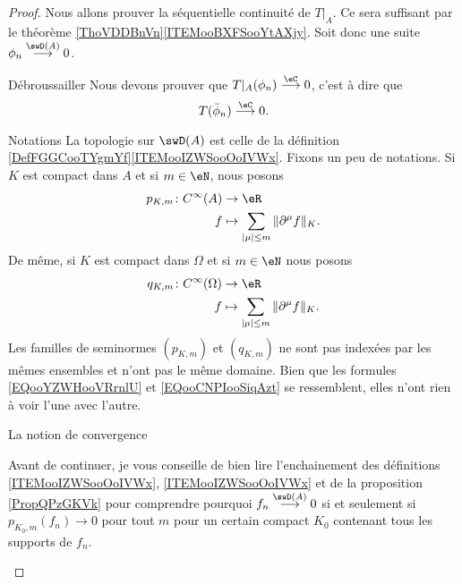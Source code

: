 \begin{proof}
    Nous allons prouver la séquentielle continuité de \( T|_A\). Ce sera suffisant par le théorème \ref{ThoVDDBnVn}\ref{ITEMooBXFSooYtAXjy}. Soit donc une suite \( \phi_n\stackrel{\swD(A)}{\longrightarrow}0\). 

    \begin{subproof}
    \item[Débroussailler]
    Nous devons prouver que \( T|_A(\phi_n)\stackrel{\eC}{\longrightarrow}0\), c'est à dire que
    \begin{equation}
        T(\bar \phi_n)\stackrel{\eC}{\longrightarrow}0.
    \end{equation}
\item[Notations]
    La topologie sur \( \swD(A)\) est celle de la définition \ref{DefFGGCooTYgmYf}\ref{ITEMooIZWSooOoIVWx}. Fixons un peu de notations. Si \( K\) est compact dans \( A\) et si \( m\in\eN\), nous posons
    \begin{equation}        \label{EQooYZWHooVRrnlU}
        \begin{aligned}
            p_{K,m}\colon  C^{\infty}(A)&\to \eR \\
            f&\mapsto \sum_{| \mu |\leq m}\| \partial^{\mu}f \|_{K}. 
        \end{aligned}
    \end{equation}
    De même, si \( K\) est compact dans \( \Omega\) et si \( m\in \eN\) nous posons
    \begin{equation}        \label{EQooCNPIooSiqAzt}
        \begin{aligned}
            q_{K,m}\colon  C^{\infty}(\Omega)&\to \eR \\
            f&\mapsto \sum_{| \mu |\leq m}\| \partial^{\mu}f \|_{K}. 
        \end{aligned}
    \end{equation}
    Les familles de seminormes \( (p_{K,m})\) et \( (q_{K,m})\) ne sont pas indexées par les mêmes ensembles et n'ont pas le même domaine. Bien que les formules \eqref{EQooYZWHooVRrnlU} et \eqref{EQooCNPIooSiqAzt} se ressemblent, elles n'ont rien à voir l'une avec l'autre.

\item[La notion de convergence]

    Avant de continuer, je vous conseille de bien lire l'enchainement des définitions \ref{ITEMooIZWSooOoIVWx}, \ref{ITEMooIZWSooOoIVWx} et de la proposition \ref{PropQPzGKVk} pour comprendre pourquoi \( f_n\stackrel{\swD(A)}{\longrightarrow}0\) si et seulement si \( p_{K_0,m}(f_n)\to 0\) pour tout \( m\) pour un certain compact \( K_0\) contenant tous les supports de \( f_n\).


\end{subproof}
\end{proof}
